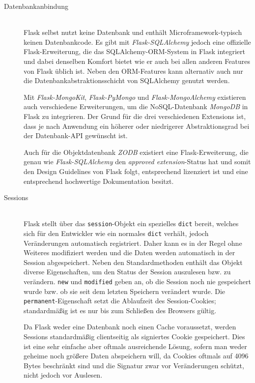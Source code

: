 \begin{description}
\item[Datenbankanbindung] \hfill \\
Flask selbst nutzt keine Datenbank und enthält Microframework-typisch keinen Datenbankcode. Es gibt
mit \emph{Flask-SQLAlchemy} jedoch eine offizielle Flask-Erweiterung, die das SQLAlchemy-ORM-System
in Flask integriert und dabei denselben Komfort bietet wie er auch bei allen anderen Features von
Flask üblich ist. Neben den ORM-Features kann alternativ auch nur die Datenbankabstraktionsschicht
von SQLAlchemy genutzt werden.

Mit \emph{Flask-MongoKit}, \emph{Flask-PyMongo} und \emph{Flask-MongoAlchemy} existieren auch
verschiedene Erweiterungen, um die NoSQL-Datenbank \emph{MongoDB} in Flask zu integrieren. Der Grund
für die drei verschiedenen Extensions ist, dass je nach Anwendung ein höherer oder niedrigerer
Abstraktionsgrad bei der Datenbank-API gewünscht ist.

Auch für die Objektdatenbank \emph{ZODB} existiert eine Flask-Erweiterung, die genau wie
\emph{Flask-SQLAlchemy} den \emph{approved extension}-Status hat und somit den Design Guidelines von
Flask folgt, entsprechend lizenziert ist und eine entsprechend hochwertige Dokumentation besitzt.


\item[Sessions] \hfill \\
Flask stellt über das \lstinline{session}-Objekt ein spezielles \lstinline{dict} bereit, welches
sich für den Entwickler wie ein normales \lstinline{dict} verhält, jedoch Veränderungen automatisch
registriert. Daher kann es in der Regel ohne Weiteres modifiziert werden und die Daten werden
automatisch in der Session abgespeichert. Neben den Standardmethoden enthält das Objekt diverse
Eigenschaften, um den Status der Session auszulesen bzw. zu verändern. \lstinline{new} und
\lstinline{modified} geben an, ob die Session noch nie gespeichert wurde bzw. ob sie seit dem
letzten Speichern verändert wurde. Die \lstinline{permanent}-Eigenschaft setzt die Ablaufzeit des
Session-Cookies; standardmäßig ist es nur bis zum Schließen des Browsers gültig.

Da Flask weder eine Datenbank noch einen Cache voraussetzt, werden Sessions standardmäßig
clientseitig als signiertes Cookie gespeichert. Dies ist eine sehr einfache aber oftmals
ausreichende Lösung, sofern man weder geheime noch größere Daten abspeichern will, da Cookies
oftmals auf 4096 Bytes beschränkt sind und die Signatur zwar vor Veränderungen schützt, nicht jedoch
vor Auslesen.


\end{description}
